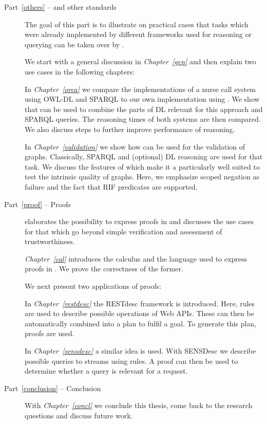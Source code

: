 \begin{description}
\item[Part~\ref{others} -- \nthree and other standards]
The goal of this part is to illustrate on practical cases 
that tasks which were already implemented by different frameworks used for reasoning or querying 
can be taken over by \nthree. 

We start with a general discussion in \emph{Chapter~\ref{gen}} and then explain 
two use cases in the following chapters: 

In \emph{Chapter~\ref{orca}} we compare the implementations of a nurse call system using OWL-DL and SPARQL to our own 
implementation using \nthree. We show that \nthree can be used to combine the parts of DL relevant for this approach and SPARQL queries. 
The reasoning times of both systems are then compared. We also discuss steps to further improve performance of reasoning.  

In \emph{Chapter~\ref{validation}} we show how \nthree can be used for the validation of \rdf graphs. 
Classically, SPARQL and (optional) DL reasoning are used for that task. We discuss the features of 
\nthree which make it a particularly well suited to test the intrinsic quality of \rdf graphs. Here, we emphasize scoped negation as failure 
and the fact that RIF predicates are supported.


% 
% 
% 

\item[Part~\ref{proof} -- Proofs]
elaborates the possibility to express proofs in \nthree and discusses the use cases for that which go 
beyond simple verification and assessment of trustworthiness.

\emph{Chapter~\ref{cal}} introduces the calculus and the language used to express proofs in \nthree. We prove the correctness of the former.

We next present two applications of proofs:

In \emph{Chapter~\ref{restdesc}} the RESTdesc framework is introduced. Here, \nthree rules are used to
describe possible operations of Web APIs. These can then be automatically combined into a plan to fulfil a goal. To generate this plan, proofs are used.

In \emph{Chapter~\ref{sensdesc}} a similar idea is used. With SENSDesc we describe possible queries to \rdf streams using rules. 
A proof can then be used to determine whether a query is relevant for a request.


\item[Part~\ref{conclusion} -- Conclusion]
With \emph{Chapter~\ref{concl}} we conclude this thesis, come back to the research questions and discuss future work.
\end{description}




